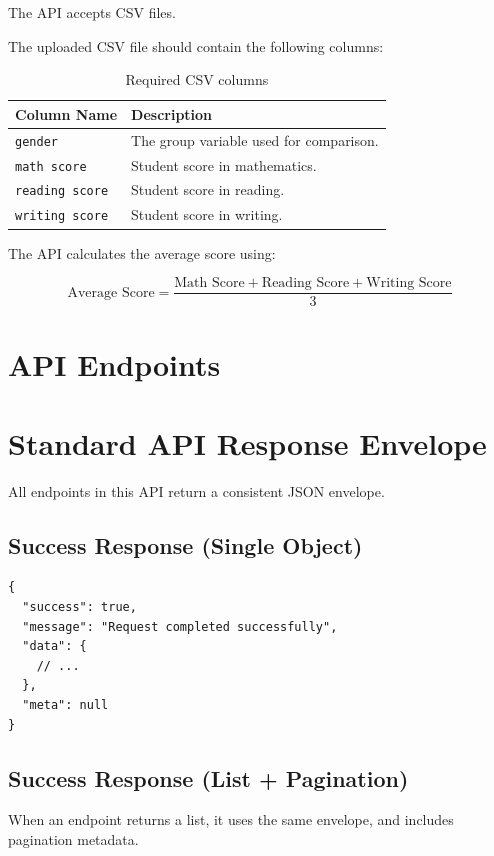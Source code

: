 \documentclass[12pt,a4paper]{article}
\begin{document}
The API accepts CSV files.

The uploaded CSV file should contain the following columns:

\begin{table}[h!]
\centering
\renewcommand{\arraystretch}{1.4}
\begin{tabular}{p{4cm} p{8cm}}
\toprule
\textbf{Column Name} & \textbf{Description} \\
\midrule
\texttt{gender} & The group variable used for comparison. \\
\texttt{math score} & Student score in mathematics. \\
\texttt{reading score} & Student score in reading. \\
\texttt{writing score} & Student score in writing. \\
\bottomrule
\end{tabular}
\caption{Required CSV columns}
\end{table}

The API calculates the average score using:

\[
\text{Average Score} =
\frac{\text{Math Score} + \text{Reading Score} + \text{Writing Score}}{3}
\]

\section{API Endpoints}

\section{Standard API Response Envelope}

All endpoints in this API return a consistent JSON envelope.

\subsection{Success Response (Single Object)}

\begin{lstlisting}
{
  "success": true,
  "message": "Request completed successfully",
  "data": {
    // ...
  },
  "meta": null
}
\end{lstlisting}

\subsection{Success Response (List + Pagination)}

When an endpoint returns a list, it uses the same envelope, and includes pagination metadata.
\end{document}
